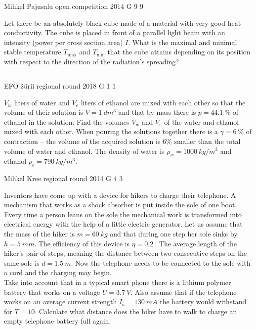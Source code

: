 \documentclass[11pt]{article}
\begin{document}
{Mihkel Pajusalu} %
{open competition} %
{2014} %
{G 9} %
{9} %
{

\ifEngStatement
Let there be an absolutely black cube made of a material with very good heat conductivity. The cube is placed in front of a parallel light beam with an intensity (power per cross section area) $I$. What is the maximal and minimal stable temperature $T_\text{max}$ and $T_\text{min}$ that the cube attains depending on its position with respect to the direction of the radiation’s spreading?
\fi
}
\newpage\subsection{\protect{}}

{EFO žürii} %
{regional round} %
{2018} %
{G 1} %
{1} %
{

\ifEngStatement
$V_w$ liters of water and $V_e$ liters of ethanol are mixed with each other so that the volume of their solution is $V=\SI{1}{dm^3}$ and that by mass there is $p=\SI{44,1}{\percent}$ of ethanol in the solution. Find the volumes $V_w$ and $V_e$ of the water and ethanol mixed with each other. When pouring the solutions together there is a $\gamma = \SI{6}{\percent}$ of contraction – the volume of the acquired solution is 6\% smaller than the total volume of water and ethanol. The density of water is $\rho_w=\SI{1000}{kg/m^3}$ and ethanol $\rho_e=\SI{790}{kg/m^3}$.
\fi
}

{Mihkel Kree} %
{regional round} %
{2014} %
{G 4} %
{3} %
{

\ifEngStatement
Inventors have come up with a device for hikers to charge their telephone. A mechanism that works as a shock absorber is put inside the sole of one boot. Every time a person leans on the sole the mechanical work is transformed into electrical energy with the help of a little electric generator. Let us assume that the mass of the hiker is $m=\SI{60}{kg}$ and that during one step her sole sinks by $h=\SI{5}{mm}$. The efficiency of this device is $\eta = \SI{0,2}{}$. The average length of the hiker’s pair of steps, meaning the distance between two consecutive steps on the same sole is $d=\SI{1.5}{m}$. Now the telephone needs to be connected to the sole with a cord and the charging may begin.\\
Take into account that in a typical smart phone there is a lithium polymer battery that works on a voltage $U=\SI{3.7}{V}$. Also assume that if the telephone works on an average current strength $I_a=\SI{130}{mA}$ the battery would withstand for $T=10$. Calculate what distance does the hiker have to walk to charge an empty telephone battery full again.
\fi
}
\end{document}
